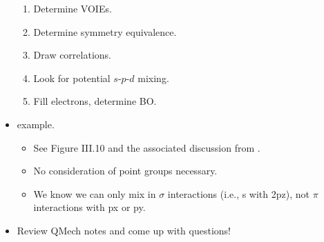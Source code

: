 \documentclass[../notes.tex]{subfiles}
\begin{document}
\begin{itemize}
\begin{enumerate}
        \item Determine VOIEs.
        \item Determine symmetry equivalence.
        \item Draw correlations.
        \item Look for potential $s$-$p$-$d$ mixing.
        \item Fill electrons, determine BO.
    \end{enumerate}
    \item {} example.
    \begin{itemize}
        \item See Figure III.10 and the associated discussion from \textcite{bib:CHEM20100Notes}.
        \item No consideration of point groups necessary.
        \item We know we can only mix in $\sigma$ interactions (i.e., s with 2pz), not $\pi$ interactions with px or py.
    \end{itemize}
    \item Review QMech notes and come up with questions!
\end{itemize}
\end{document}
